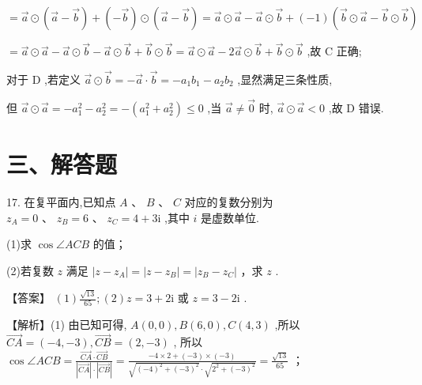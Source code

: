 \documentclass[10pt]{article}
\begin{document}
\(= \overrightarrow{a} \odot  \left( {\overrightarrow{a} - \overrightarrow{b}}\right)  + \left( {-\overrightarrow{b}}\right)  \odot  \left( {\overrightarrow{a} - \overrightarrow{b}}\right)  = \overrightarrow{a} \odot  \overrightarrow{a} - \overrightarrow{a} \odot  \overrightarrow{b} + \left( {-1}\right) \left( {\overrightarrow{b} \odot  \overrightarrow{a} - \overrightarrow{b} \odot  \overrightarrow{b}}\right)\)

\(= \overrightarrow{a} \odot  \overrightarrow{a} - \overrightarrow{a} \odot  \overrightarrow{b} - \overrightarrow{a} \odot  \overrightarrow{b} + \overrightarrow{b} \odot  \overrightarrow{b} = \overrightarrow{a} \odot  \overrightarrow{a} - 2\overrightarrow{a} \odot  \overrightarrow{b} + \overrightarrow{b} \odot  \overrightarrow{b}\) ,故 C 正确;

对于 \(\mathrm{D}\) ,若定义 \(\overrightarrow{a} \odot  \overrightarrow{b} =  - \overrightarrow{a} \cdot  \overrightarrow{b} =  - {a}_{1}{b}_{1} - {a}_{2}{b}_{2}\) ,显然满足三条性质,

但 \(\overrightarrow{a} \odot  \overrightarrow{a} =  - {a}_{1}^{2} - {a}_{2}^{2} =  - \left( {{a}_{1}^{2} + {a}_{2}^{2}}\right)  \leq  0\) ,当 \(\overrightarrow{a} \neq  \overrightarrow{0}\) 时, \(\overrightarrow{a} \odot  \overrightarrow{a} < 0\) ,故 D 错误.

\section*{三、解答题}

17. 在复平面内,已知点 \(A\text{ 、 }B\text{ 、 }C\) 对应的复数分别为 \({z}_{A} = 0\text{ 、 }{z}_{B} = 6\text{ 、 }{z}_{C} = 4 + 3\mathrm{i}\) ,其中 \(i\) 是虚数单位.

(1)求 \(\cos \angle {ACB}\) 的值；

(2)若复数 \(z\) 满足 \(\left| {z - {z}_{A}}\right|  = \left| {z - {z}_{B}}\right|  = \left| {{z}_{B} - {z}_{C}}\right|\) ，求 \(z\) .

【答案】 \(\left( 1\right) \frac{\sqrt{13}}{65};\left( 2\right) z = 3 + 2\mathrm{i}\) 或 \(z = 3 - 2\mathrm{i}\) .

【解析】(1) 由已知可得, \(A\left( {0,0}\right) ,B\left( {6,0}\right) ,C\left( {4,3}\right)\) ,所以 \(\overrightarrow{CA} = \left( {-4, - 3}\right) ,\overrightarrow{CB} = \left( {2, - 3}\right)\) , 所以 \(\cos \angle {ACB} = \frac{\overrightarrow{CA} \cdot  \overrightarrow{CB}}{\left| \overrightarrow{CA}\right|  \cdot  \left| \overrightarrow{CB}\right| } = \frac{-4 \times  2 + \left( {-3}\right)  \times  \left( {-3}\right) }{\sqrt{{\left( -4\right) }^{2} + {\left( -3\right) }^{2}} \cdot  \sqrt{{2}^{2} + {\left( -3\right) }^{2}}} = \frac{\sqrt{13}}{65}\) ；
\end{document}
